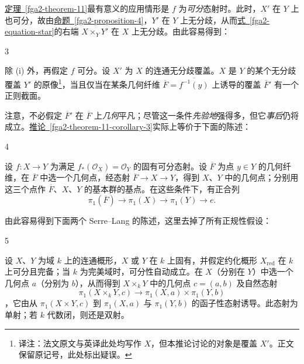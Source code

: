 \par{}\hyperref[fga2-theorem-11]{定理~\ref*{fga2-theorem-11}}最有意义的应用情形是 \(f\) 为\emph{可分}态射时。此时，\(X'\) 在 \(Y\) 上也可分，故由\hyperref[fga2-proposition-4]{命题~\ref*{fga2-proposition-4}}，\(Y'\) 在 \(Y\) 上无分歧，从而\hyperref[fga2-equation-star]{式~\ref*{fga2-equation-star}}的右端 \(X\times _YY'\) 在 \(X\) 上无分歧。由此容易得到：
\begin{corollary}{3}\label{fga2-theorem-11-corollary-3}\skipsinglepar
\par{}除 (i) 外，再假定 \(f\) 可分。设 \(X'\) 为 \(X\) 的连通无分歧覆盖。\(X\) 是 \(Y\) 的某个无分歧覆盖 \(Y'\) 的原像\footnote{译注：法文原文与英译此处均写作 \(X\)，但本推论讨论的对象是覆盖 \(X'\)。正文保留原记号，此处标出疑误。}，当且仅当在某条几何纤维 \(\overline {F}=\overline {f^{-1}(y)}\) 上诱导的覆盖 \(\overline {F}'\) 有一个正则截面。\end{corollary}
\par{}注意，不必假定 \(\overline {F}'\) 在 \(\overline {F}\) 上\emph{几何}平凡；尽管这一条件\emph{先验地}强得多，但它\emph{事后}仍将成立。\hyperref[fga2-theorem-11-corollary-3]{推论~\ref*{fga2-theorem-11-corollary-3}}实际上等价于下面的陈述：
\begin{corollary}{4}\label{fga2-theorem-11-corollary-4}\skipsinglepar
\par{}设 \(f\colon  X\to  Y\) 为满足 \(f_*(\mathcal {O}_X)=\mathcal {O}_Y\) 的固有可分态射。设 \(\overline {F}\) 为点 \(y\in  Y\) 的几何纤维，在 \(\overline {F}\) 中选一个几何点，经态射 \(\overline {F}\to  X\to  Y\)，得到 \(X\)、\(Y\) 中的几何点；分别用这三个点作 \(\overline {F}\)、\(X\)、\(Y\) 的基本群的基点。在这些条件下，有正合列 \[       \boxed {\pi _1(\overline {F}) \to  \pi _1(X) \to  \pi _1(Y) \to  e.}     \]\end{corollary}
\par{}由此容易得到下面两个 Serre–Lang 的陈述，这里去掉了所有正规性假设：
\begin{corollary}{5}\label{fga2-theorem-11-corollary-5}\skipsinglepar
\par{}设 \(X\)、\(Y\) 为域 \(k\) 上的连通概形，\(X\) 或 \(Y\) 在 \(k\) 上固有，并假定约化概形 \(X_\mathrm {red}\) 在 \(k\) 上可分且完备；当 \(k\) 为完美域时，可分性自动成立。在 \(X\)（分别在 \(Y\)）中选一个几何点 \(a\)（分别为 \(b\)），从而得到 \(X\times _kY\) 中的几何点 \(c=(a,b)\) 及自然态射 \[       \pi _1(X\times _kY,c) \to  \pi _1(X,a)\times \pi _1(Y,b)     \]，它由从 \(\pi _1(X\times  Y,c)\) 到 \(\pi _1(X,a)\) 与 \(\pi _1(Y,b)\) 的函子性态射诱导。此态射为单射；若 \(k\) 代数闭，则还是双射。\end{corollary}
